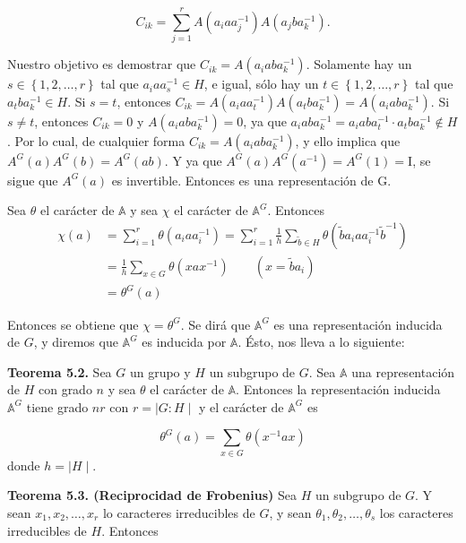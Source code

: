 \documentclass[12pt]{book}
\theoremstyle{definition}
\newcounter{in}
\begin{document}
\begin{equation*}
  C_{ik} = \sum_{j=1}^{r} A(a_{i} a a_{j}^{-1}) A(a_{j} b a_{k}^{-1}).
\end{equation*}

Nuestro objetivo es demostrar que $C_{ik}= A(a_{i} ab
a_{k}^{-1})$. Solamente hay un $s \in \left\{1, 2, \ldots, r \right\}$
tal que $a_{i} a a_{s}^{-1} \in H$, e igual, sólo hay un
$t \in \left\{1, 2, \ldots, r \right\}$ tal que
$a_{t} b a_{k}^{-1} \in H$. Si $s=t$, entonces
$C_{ik}=A(a_{i} a a_{t}^{-1}) A(a_{t} b a_{k}^{-1})=A(a_{i} ab
a_{k}^{-1})$. Si $s \neq t$, entonces $C_{ik}=0$ y
$A(a_{i} ab a_{k}^{-1}) = 0$, ya que
$a_{i} ab a_{k}^{-1} = a_{i} ab a_{t}^{-1} \cdot a_{t} b a_{k}^{-1}
\notin H$ . Por lo cual, de cualquier forma
$C_{ik} = A(a_{i} ab a_{k}^{-1})$, y ello implica que
$A^{G}(a)A^{G}(b)=A^{G}(ab)$. Y ya que
$A^{G}(a)A^{G}(a^{-1})=A^{G}(1)=\mathrm{I}$, se sigue que $A^{G}(a)$
es invertible. Entonces es una representación de G.

Sea $\theta$ el carácter de $\mathbb{A}$ y sea $\chi$ el carácter de
$\mathbb{A}^{G}$. Entonces
\begin{equation*}
  \begin{aligned}
    \chi(a) &= \sum_{i=1}^{r} \theta(a_{i} a a_{i}^{-1}) = \sum_{i=1}^{r} \frac{1}{h} \sum_{\tilde{b} \in H} \theta(\tilde{b} a_{i} a a_{i}^{-1} \tilde{b}^{-1})\\
    &= \frac{1}{h} \sum_{x \in G} \theta(x a x^{-1}) \qquad (x=\tilde{b}a_{i})\\
    &= \theta^{G}(a)
  \end{aligned}
\end{equation*}

Entonces se obtiene que $\chi=\theta^{G}$. Se dirá que
$\mathbb{A}^{G}$ es una representación inducida de $G$, y diremos que
$\mathbb{A}^{G}$ es inducida por $\mathbb{A}$. Ésto, nos lleva a lo
siguiente:

\textbf{Teorema 5.2. } Sea $G$ un grupo y $H$ un subgrupo de $G$. Sea
$\mathbb{A}$ una representación de $H$ con grado $n$ y sea $\theta$ el
carácter de $\mathbb{A}$. Entonces la representación inducida
$\mathbb{A}^{G}$ tiene grado $nr$ con $r=\mid G:H \mid$ y el carácter
de $\mathbb{A}^{G}$ es

\begin{equation*}
  \theta^{G}(a)= \sum_{x \in G} \theta(x^{-1} a x)
\end{equation*}
donde $h= \mid H \mid$.

\textbf{Teorema 5.3. (Reciprocidad de Frobenius) } Sea $H$ un subgrupo
de $G$. Y sean $x_{1}, x_{2},\ldots,x_{r}$ lo caracteres irreducibles
de $G$, y sean $\theta_{1},\theta_{2},\ldots,\theta_{s}$ los
caracteres irreducibles de $H$. Entonces
\end{document}

